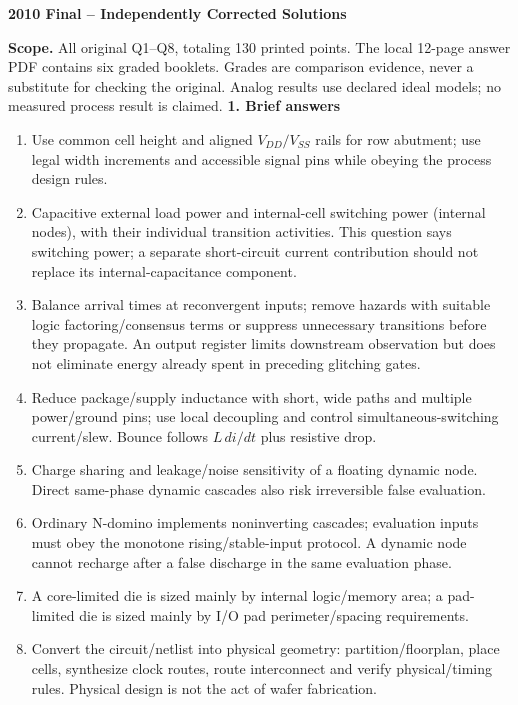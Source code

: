 \documentclass[10pt]{article}
\begin{document}
\begin{center}{\Large\bfseries 2010 Final -- Independently Corrected Solutions}\end{center}
\textbf{Scope.} All original Q1--Q8, totaling 130 printed points. The local 12-page answer PDF contains six graded booklets. Grades are comparison evidence, never a substitute for checking the original. Analog results use declared ideal models; no measured process result is claimed.
\textbf{1. Brief answers}
\begin{enumerate}[label=(\alph*),leftmargin=7mm]
\item Use common cell height and aligned $V_{DD}/V_{SS}$ rails for row abutment; use legal width increments and accessible signal pins while obeying the process design rules.
\item Capacitive external load power and internal-cell switching power (internal nodes), with their individual transition activities. This question says switching power; a separate short-circuit current contribution should not replace its internal-capacitance component.
\item Balance arrival times at reconvergent inputs; remove hazards with suitable logic factoring/consensus terms or suppress unnecessary transitions before they propagate. An output register limits downstream observation but does not eliminate energy already spent in preceding glitching gates.
\item Reduce package/supply inductance with short, wide paths and multiple power/ground pins; use local decoupling and control simultaneous-switching current/slew. Bounce follows $L\,di/dt$ plus resistive drop.
\item Charge sharing and leakage/noise sensitivity of a floating dynamic node. Direct same-phase dynamic cascades also risk irreversible false evaluation.
\item {\raggedright Ordinary N-domino implements noninverting cascades; evaluation inputs must obey the monotone rising/stable-input protocol. A dynamic node cannot recharge after a false discharge in the same evaluation phase.\par}
\item A core-limited die is sized mainly by internal logic/memory area; a pad-limited die is sized mainly by I/O pad perimeter/spacing requirements.
\item Convert the circuit/netlist into physical geometry: partition/floorplan, place cells, synthesize clock routes, route interconnect and verify physical/timing rules. Physical design is not the act of wafer fabrication.
\end{enumerate}
\end{document}
